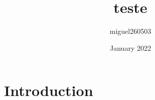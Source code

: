 \documentclass{article}
\title{teste}
\author{miguel260503 }
\date{January 2022}
\begin{document}
\maketitle

\section{Introduction}
\end{document}

